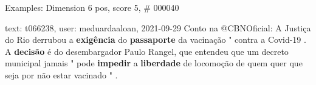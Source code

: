 \begin{frame}{Examples: Dimension 6 pos, score 5, \# 000040}
\footnotesize
\begin{exampleblock}{text: t066238, user: meduardaaloan, 2021-09-29}
Conto na @CBNOficial: A Justiça do Rio derrubou a \textbf{exigência} do 
\textbf{passaporte} da vacinação " contra a Covid-19 . A \textbf{decisão} é do 
desembargador Paulo Rangel, que entendeu que um decreto municipal jamais " pode 
\textbf{impedir} a \textbf{liberdade} de locomoção de quem quer que seja por 
não estar vacinado " . 
\end{exampleblock}
\end{frame}
